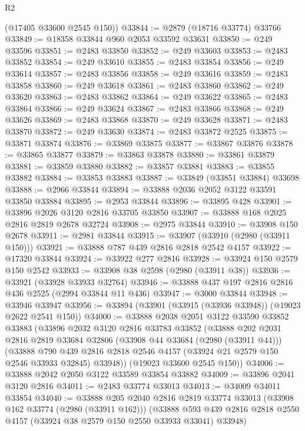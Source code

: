 \begin{lexlean}{R2}
\begin{coremodule}
      (@17405 @33600 @2545 @150))
@33844 := @2879 (@18716 @33774) @33766
@33849 := @18358 @33844 @960 @2053 @33592 @33631
@33850 := @249 @33596
@33851 := @2483 @33850
@33852 := @249 @33603
@33853 := @2483 @33852
@33854 := @249 @33610
@33855 := @2483 @33854
@33856 := @249 @33614
@33857 := @2483 @33856
@33858 := @249 @33616
@33859 := @2483 @33858
@33860 := @249 @33618
@33861 := @2483 @33860
@33862 := @249 @33620
@33863 := @2483 @33862
@33864 := @249 @33622
@33865 := @2483 @33864
@33866 := @249 @33624
@33867 := @2483 @33866
@33868 := @249 @33626
@33869 := @2483 @33868
@33870 := @249 @33628
@33871 := @2483 @33870
@33872 := @249 @33630
@33874 := @2483 @33872 @2525
@33875 := @33871 @33874
@33876 := @33869 @33875
@33877 := @33867 @33876
@33878 := @33865 @33877
@33879 := @33863 @33878
@33880 := @33861 @33879
@33881 := @33859 @33880
@33882 := @33857 @33881
@33883 := @33855 @33882
@33884 := @33853 @33883
@33887 := @33849 (@33851 @33884) @33698
@33888 := @2966 @33844
@33894 := @33888 @2036 @2052 @3122 @33591 @33850 @33884
@33895 := @2953 @33844
@33896 := @33895 @428
@33901 := @33896 @2026 @3120 @2816 @33705 @33850
@33907 := @33888 @168 @2025 @2816 @2819 @2678 @32724
@33908 := @2975 @33844
@33910 := @33908 @150 @2678
@33911 := @2981 @33844
@33915 := @33907 (@33910 (@2980 (@33911 @150)))
@33921 := @33888 @787 @439 @2816 @2818 @2542 @4157
@33922 := @17320 @33844
@33924 := @33922 @277 @2816
@33928 := @33924 @150 @2579 @150 @2542
@33933 := @33908 @38 @2598 (@2980 (@33911 @38))
@33936 := @33921 (@33928 @33933 @32764)
@33946 := @33888 @437 @197 @2816 @2816 @436 @2525 (@2994 @33844 @11 @436)
@33947 := @3000 @33844
@33948 := @33946 @33947
@33956 := @33894 (@33901 (@33915 (@33936 @33948)) (@19023 @2622 @2541 @150))
@34000 := @33888
    @2038
    @2051
    @3122
    @33590
    @33852
    @33883
    (@33896
      @2032
      @3120
      @2816
      @33783
      @33852
      (@33888
        @202
        @2031
        @2816
        @2819
        @33684
        @32806
        (@33908 @44 @33684 (@2980 (@33911 @44)))
        (@33888
          @790
          @439
          @2816
          @2818
          @2546
          @4157
          (@33924 @21 @2579 @150 @2546 @33933 @32845)
          @33948))
      (@19023 @33600 @2545 @150))
@34006 := @33888 @2042 @2050 @3122 @33589 @33854 @33882
@34009 := @33896 @2041 @3120 @2816
@34011 := @2483 @33774 @33013
@34013 := @34009 @34011 @33854
@34040 := @33888
    @205
    @2040
    @2816
    @2819
    @33774
    @33013
    (@33908 @162 @33774 (@2980 (@33911 @162)))
    (@33888 @593 @439 @2816 @2818 @2550 @4157 (@33924 @38 @2579 @150 @2550 @33933 @33041) @33948)

\end{coremodule}
\end{lexlean}
